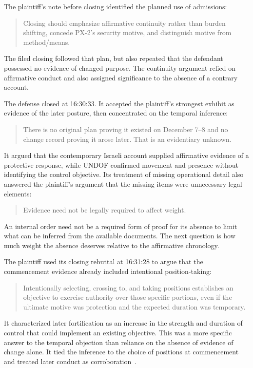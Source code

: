 The plaintiff's note before closing identified the planned use of admissions:
\begin{quote}
Closing should emphasize affirmative continuity rather than burden shifting, concede PX-2's security motive, and distinguish motive from method/means.
\end{quote}
The filed closing followed that plan, but also repeated that the defendant possessed no evidence of changed purpose.  The continuity argument relied on affirmative conduct and also assigned significance to the absence of a contrary account.

The defense closed at 16:30:33.  It accepted the plaintiff's strongest exhibit as evidence of the later posture, then concentrated on the temporal inference:
\begin{quote}
There is no original plan proving it existed on December 7--8 and no change record proving it arose later.  That is an evidentiary unknown.
\end{quote}
It argued that the contemporary Israeli account supplied affirmative evidence of a protective response, while UNDOF confirmed movement and presence without identifying the control objective.  Its treatment of missing operational detail also answered the plaintiff's argument that the missing items were unnecessary legal elements:
\begin{quote}
Evidence need not be legally required to affect weight.
\end{quote}
An internal order need not be a required form of proof for its absence to limit what can be inferred from the available documents.  The next question is how much weight the absence deserves relative to the affirmative chronology.

The plaintiff used its closing rebuttal at 16:31:28 to argue that the commencement evidence already included intentional position-taking:
\begin{quote}
Intentionally selecting, crossing to, and taking positions establishes an objective to exercise authority over those specific portions, even if the ultimate motive was protection and the expected duration was temporary.
\end{quote}
It characterized later fortification as an increase in the strength and duration of control that could implement an existing objective.  This was a more specific answer to the temporal objection than reliance on the absence of evidence of change alone.  It tied the inference to the choice of positions at commencement and treated later conduct as corroboration~\cite[events 332--334]{record}.

